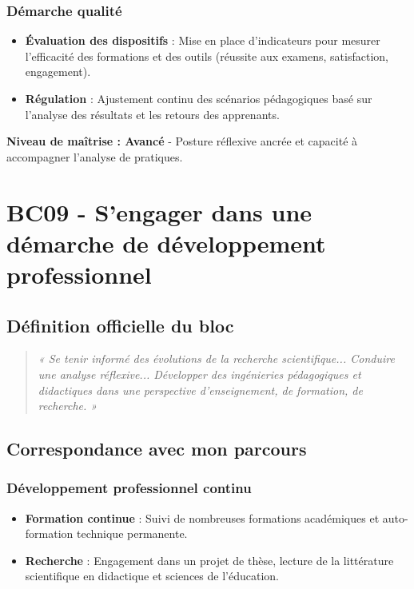 \subsubsection{Démarche qualité}
\begin{itemize}[leftmargin=*]
    \item \textbf{Évaluation des dispositifs} : Mise en place d'indicateurs pour mesurer l'efficacité des formations et des outils (réussite aux examens, satisfaction, engagement).
    \item \textbf{Régulation} : Ajustement continu des scénarios pédagogiques basé sur l'analyse des résultats et les retours des apprenants.
\end{itemize}

\textbf{Niveau de maîtrise : Avancé} - Posture réflexive ancrée et capacité à accompagner l'analyse de pratiques.

\vspace{1cm}

\section{BC09 - S'engager dans une démarche de développement professionnel}

\subsection{Définition officielle du bloc}
\begin{quote}
\textit{« Se tenir informé des évolutions de la recherche scientifique... Conduire une analyse réflexive... Développer des ingénieries pédagogiques et didactiques dans une perspective d'enseignement, de formation, de recherche. »} \parencite{rncp38152}
\end{quote}

\subsection{Correspondance avec mon parcours}

\subsubsection{Développement professionnel continu}
\begin{itemize}[leftmargin=*]
    \item \textbf{Formation continue} : Suivi de nombreuses formations académiques et auto-formation technique permanente.
    \item \textbf{Recherche} : Engagement dans un projet de thèse, lecture de la littérature scientifique en didactique et sciences de l'éducation.
\end{itemize}

